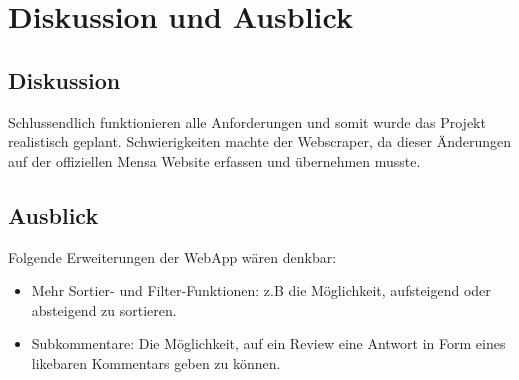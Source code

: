 \chapter{Diskussion und Ausblick}\label{chap:diskussion}

\section{Diskussion}\label{sub:diskussion}

Schlussendlich funktionieren alle Anforderungen und somit wurde das Projekt
realistisch geplant. Schwierigkeiten machte der Webscraper, da dieser Änderungen
auf der offiziellen Mensa Website erfassen und übernehmen musste.

\section{Ausblick}\label{sub:ausblick}

Folgende Erweiterungen der WebApp wären denkbar: 
\begin{itemize}
    \item Mehr Sortier- und Filter-Funktionen: z.B die Möglichkeit, aufsteigend
    oder absteigend zu sortieren.
    \item Subkommentare: Die Möglichkeit, auf ein Review eine Antwort in Form
    eines likebaren Kommentars geben zu können.
\end{itemize}




